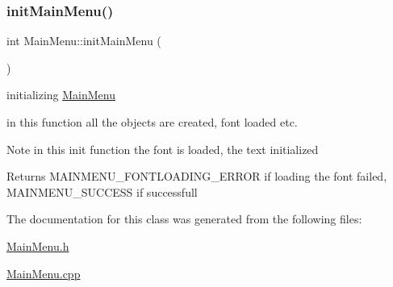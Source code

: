 \subsubsection{\texorpdfstring{init\+Main\+Menu()}{initMainMenu()}}
{\footnotesize\ttfamily int Main\+Menu\+::init\+Main\+Menu (\begin{DoxyParamCaption}{ }\end{DoxyParamCaption})}



initializing \hyperlink{classMainMenu}{Main\+Menu} 

in this function all the objects are created, font loaded etc.

\begin{DoxyNote}{Note}
in this init function the font is loaded, the text initialized
\end{DoxyNote}
\begin{DoxyReturn}{Returns}
M\+A\+I\+N\+M\+E\+N\+U\+\_\+\+F\+O\+N\+T\+L\+O\+A\+D\+I\+N\+G\+\_\+\+E\+R\+R\+OR if loading the font failed, M\+A\+I\+N\+M\+E\+N\+U\+\_\+\+S\+U\+C\+C\+E\+SS if successfull 
\end{DoxyReturn}


The documentation for this class was generated from the following files\+:\begin{DoxyCompactItemize}
\item 
\hyperlink{MainMenu_8h}{Main\+Menu.\+h}\item 
\hyperlink{MainMenu_8cpp}{Main\+Menu.\+cpp}\end{DoxyCompactItemize}
